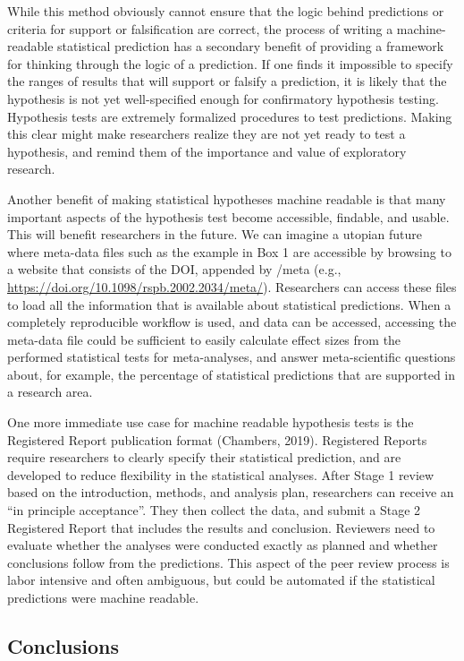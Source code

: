 \documentclass[doc,floatsintext]{apa6}
\begin{document}
While this method obviously cannot ensure that the logic behind predictions or criteria for support or falsification are correct, the process of writing a machine-readable statistical prediction has a secondary benefit of providing a framework for thinking through the logic of a prediction. If one finds it impossible to specify the ranges of results that will support or falsify a prediction, it is likely that the hypothesis is not yet well-specified enough for confirmatory hypothesis testing. Hypothesis tests are extremely formalized procedures to test predictions. Making this clear might make researchers realize they are not yet ready to test a hypothesis, and remind them of the importance and value of exploratory research.

Another benefit of making statistical hypotheses machine readable is that many important aspects of the hypothesis test become accessible, findable, and usable. This will benefit researchers in the future. We can imagine a utopian future where meta-data files such as the example in Box 1 are accessible by browsing to a website that consists of the DOI, appended by /meta (e.g., \url{https://doi.org/10.1098/rspb.2002.2034/meta/}). Researchers can access these files to load all the information that is available about statistical predictions. When a completely reproducible workflow is used, and data can be accessed, accessing the meta-data file could be sufficient to easily calculate effect sizes from the performed statistical tests for meta-analyses, and answer meta-scientific questions about, for example, the percentage of statistical predictions that are supported in a research area.

One more immediate use case for machine readable hypothesis tests is the Registered Report publication format (Chambers, 2019). Registered Reports require researchers to clearly specify their statistical prediction, and are developed to reduce flexibility in the statistical analyses. After Stage 1 review based on the introduction, methods, and analysis plan, researchers can receive an \enquote{in principle acceptance}. They then collect the data, and submit a Stage 2 Registered Report that includes the results and conclusion. Reviewers need to evaluate whether the analyses were conducted exactly as planned and whether conclusions follow from the predictions. This aspect of the peer review process is labor intensive and often ambiguous, but could be automated if the statistical predictions were machine readable.

\hypertarget{conclusions}{%
\subsection{Conclusions}\label{conclusions}}
\end{document}
